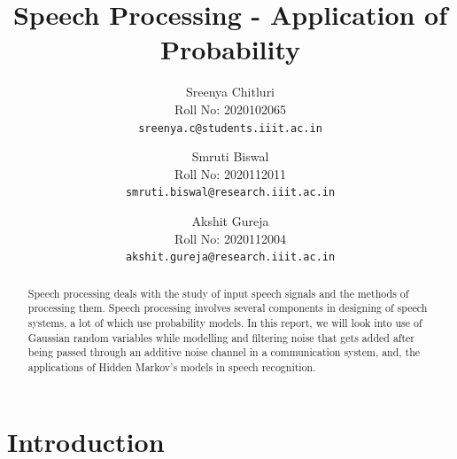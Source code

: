 \documentclass[10pt,twocolumn,letterpaper]{article}
\begin{document}
\title{Speech Processing - Application of Probability}

\author{
Sreenya Chitluri\\
Roll No: 2020102065\\
{\tt\small sreenya.c@students.iiit.ac.in}

\and
Smruti Biswal\\
Roll No: 2020112011\\
{\tt\small smruti.biswal@research.iiit.ac.in}
\and
Akshit Gureja\\
Roll No: 2020112004\\
{\tt\small akshit.gureja@research.iiit.ac.in} 
}

\maketitle
\thispagestyle{empty}


\begin{abstract}
   Speech processing deals with the study of input speech signals and the methods of processing them. Speech processing involves several components in designing of speech systems, a lot of which use probability models. In this report, we will look into use of Gaussian random variables while modelling and filtering noise that gets added after being passed through an additive noise channel in a communication system, and, the applications of Hidden Markov's models in speech recognition. 
\end{abstract}

\section{\textbf{Introduction}}
\end{document}
